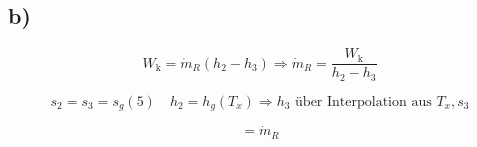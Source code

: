 

\subsection*{b)}

\[
W_{\text{k}} = \dot{m}_R (h_2 - h_3) \Rightarrow \dot{m}_R = \frac{W_{\text{k}}}{h_2 - h_3}
\]

\[
s_2 = s_3 = s_g(5) \quad h_2 = h_g(T_x) \Rightarrow h_3 \text{ über Interpolation aus } T_x, s_3
\]

\[
= \dot{m}_R
\]